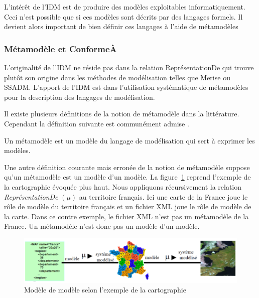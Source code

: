 L'intérêt de l'IDM est de produire des modèles exploitables informatiquement. 
Ceci n'est possible que si ces modèles sont décrits par des langages formels. Il 
devient alors important de bien définir ces langages à l'aide de métamodèles

\subsubsection{Métamodèle et ConformeÀ}
L'originalité de l'IDM ne réside pas dans la relation ReprésentationDe qui 
trouve plutôt son origine dans les méthodes de modélisation telles que Merise ou 
SSADM. L'apport de l'IDM est dans l'utilisation systématique de métamodèles pour 
la description des langages de modélisation. 

Il existe plusieurs définitions de la notion de métamodèle dans la littérature. 
Cependant la définition suivante est communément admise 
\cite{bezivin2004rapport}.

\begin{definition}
Un métamodèle est un modèle du langage de modélisation qui sert à exprimer les 
modèles.
\end{definition}
Une autre définition courante mais erronée de la notion de métamodèle suppose 
qu'un métamodèle est un modèle d'un modèle. La figure~\ref{fig:modelofmodel} 
reprend l'exemple de la cartographie évoquée plus haut. Nous appliquons 
récursivement la relation \textit{ReprésentationDe} $(\mu)$ au territoire 
français. Ici une carte de la France joue le rôle de modèle du territoire 
français et un fichier XML joue le rôle de modèle de la carte. Dans ce contre 
exemple, le fichier XML n'est pas un métamodèle de la France. Un métamodèle 
n'est donc pas un modèle d'un modèle.

\begin{figure}[!htbp]
 \begin{center}
  \includegraphics[width=1\textwidth]{images/Chapitre1/modelofmodel.png}
 \end{center}
 \caption{Modèle de modèle selon l'exemple de la cartographie 
\protect\cite{favre2006ingenierie}}
 \label{fig:modelofmodel}
\end{figure}

